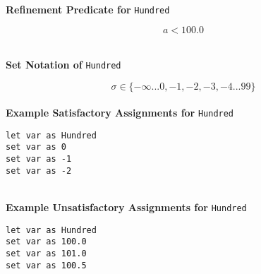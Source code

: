 \documentclass{article}
\begin{document}
\textbf{\\ Refinement Predicate for } \texttt{Hundred}

$$ a < 100.0 $$

\textbf{\\ Set Notation of } \texttt{Hundred}

$$\sigma \in \{ -\infty ... 0, -1, -2, -3, -4 ... 99 \}$$ \ \
\textbf{\\ Example Satisfactory Assignments for } \texttt{Hundred}
\begin{verbatim}
let var as Hundred
set var as 0
set var as -1
set var as -2
\end{verbatim}


\textbf{\\ Example Unsatisfactory Assignments for } \texttt{Hundred}
\begin{verbatim}
let var as Hundred
set var as 100.0
set var as 101.0
set var as 100.5
\end{verbatim}


\clearpage
\end{document}
